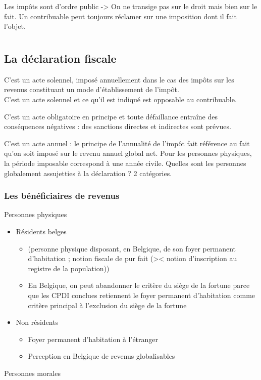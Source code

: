 \documentclass{book}
\begin{document}
Les impôts sont d'ordre public -> On ne transige pas sur le droit mais bien sur le fait. Un contribuable peut toujours réclamer sur une imposition dont il fait l'objet.



\chapter{}

\section{La déclaration fiscale} 
C’est un acte solennel, imposé annuellement dans le cas des impôts sur les revenus constituant un mode d’établissement de l’impôt.\\

C’est un acte solennel et ce qu’il est indiqué est opposable au contribuable. 

C’est un acte obligatoire en principe et toute défaillance entraîne des conséquences négatives : des sanctions directes et indirectes sont prévues. 

C’est un acte annuel : le principe de l’annualité de l’impôt  fait référence au fait qu’on soit imposé sur le revenu annuel global net. Pour les personnes physiques, la période imposable correspond à une année civile. 
Quelles sont les personnes globalement assujetties à la déclaration ? 2 catégories. 

\subsection{Les bénéficiaires de revenus} 

Personnes physiques

\begin{itemize}
\item Résidents belges 
\begin{itemize}
\item (personne physique disposant, en Belgique, de son foyer permanent d’habitation ; notion fiscale de pur fait (>< notion d’inscription au registre de la population))
\item En Belgique, on peut abandonner le critère du siège de la fortune parce que les CPDI conclues retiennent le foyer permanent d’habitation comme critère principal à l’exclusion du siège de la fortune 
\end{itemize}
\item Non résidents 
\begin{itemize}
\item Foyer permanent d’habitation à l’étranger 
\item Perception en Belgique de revenus globalisables 
\end{itemize}
\end{itemize}
\null
Personnes morales 
\end{document}
